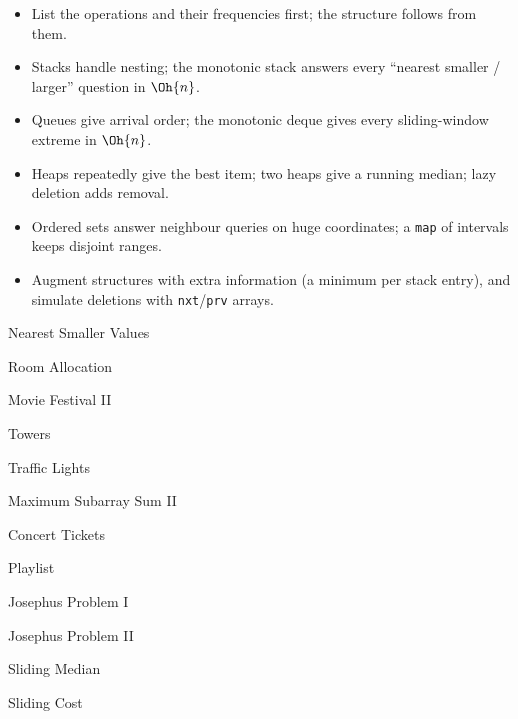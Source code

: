 \begin{summary}
\begin{itemize}
  \item List the operations and their frequencies first; the structure follows from them.
  \item Stacks handle nesting; the monotonic stack answers every ``nearest smaller / larger'' question in $\Oh{n}$.
  \item Queues give arrival order; the monotonic deque gives every sliding-window extreme in $\Oh{n}$.
  \item Heaps repeatedly give the best item; two heaps give a running median; lazy deletion adds removal.
  \item Ordered sets answer neighbour queries on huge coordinates; a \texttt{map} of intervals keeps disjoint ranges.
  \item Augment structures with extra information (a minimum per stack entry), and simulate deletions with
        \texttt{nxt}/\texttt{prv} arrays.
\end{itemize}
\end{summary}

\begin{practice}
\begin{pplist}
  \item Nearest Smaller Values
  \item Room Allocation
  \item Movie Festival II
  \item Towers
  \item Traffic Lights
  \item Maximum Subarray Sum II
\end{pplist}
\begin{pplist}
  \item Concert Tickets
  \item Playlist
  \item Josephus Problem I
  \item Josephus Problem II
  \item Sliding Median
  \item Sliding Cost
\end{pplist}
\end{practice}
